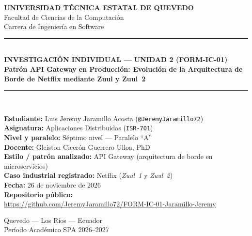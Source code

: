 \documentclass[10pt,a4paper]{article}
\begin{document}
\begin{titlepage}
    \centering
    \vspace*{1.0cm}
    {\Large \textbf{UNIVERSIDAD TÉCNICA ESTATAL DE QUEVEDO}}\\[0.25cm]
    {\large Facultad de Ciencias de la Computación}\\[0.15cm]
    {\large Carrera de Ingeniería en Software}\\[1.6cm]

    \rule{\linewidth}{0.5mm}\\[0.35cm]
    {\large \textbf{INVESTIGACIÓN INDIVIDUAL — UNIDAD 2 (FORM-IC-01)}}\\[0.30cm]
    {\LARGE \textbf{Patrón API Gateway en Producción: Evolución de la Arquitectura de Borde de Netflix mediante Zuul y Zuul~2}}\\[0.30cm]
    \rule{\linewidth}{0.5mm}\\[1.6cm]

    \begin{flushleft}
        \large
        \textbf{Estudiante:} Luis Jeremy Jaramillo Acosta (\texttt{@JeremyJaramillo72})\\[0.28cm]
        \textbf{Asignatura:} Aplicaciones Distribuidas (\texttt{ISR-701})\\[0.28cm]
        \textbf{Nivel y paralelo:} Séptimo nivel — Paralelo ``A''\\[0.28cm]
        \textbf{Docente:} Gleiston Cicerón Guerrero Ulloa, PhD\\[0.28cm]
        \textbf{Estilo / patrón analizado:} API Gateway (arquitectura de borde en microservicios)\\[0.28cm]
        \textbf{Caso industrial registrado:} Netflix (\emph{Zuul~1} y \emph{Zuul~2})\\[0.28cm]
        \textbf{Fecha:} 26 de noviembre de 2026\\[0.35cm]
        \textbf{Repositorio público:}\\
        {\normalsize \url{https://github.com/JeremyJaramillo72/FORM-IC-01-Jaramillo-Jeremy}}
    \end{flushleft}

    \vfill
    {\normalsize Quevedo — Los Ríos — Ecuador\\[0.12cm]
    Período Académico SPA 2026--2027}
\end{titlepage}
\end{document}
